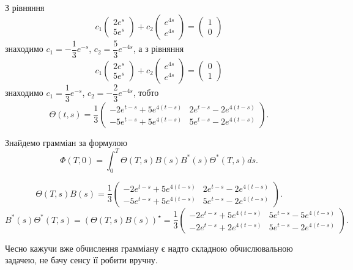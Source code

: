 \begin{solution}
    З рівняння
    \[ c_1 \begin{pmatrix} 2e^s \\ 5e^s \end{pmatrix} + c_2 \begin{pmatrix} e^{4s} \\ e^{4s} \end{pmatrix} = \begin{pmatrix} 1 \\ 0 \end{pmatrix} \]
    знаходимо $c_1 = -\dfrac13 e^{-s}$, $c_2 = \dfrac53 e^{-4s}$, а з рівняння
    \[ c_1 \begin{pmatrix} 2e^s \\ 5e^s \end{pmatrix} + c_2 \begin{pmatrix} e^{4s} \\ e^{4s} \end{pmatrix} = \begin{pmatrix} 0 \\ 1 \end{pmatrix} \]
    знаходимо $c_1 = \dfrac13 e^{-s}$, $c_2 = -\dfrac23 e^{-4s}$, тобто
    \[ \Theta(t, s) = \dfrac13\begin{pmatrix} -2 e^{t-s} + 5 e^{4(t-s)} & 2 e^{t-s} - 2 e^{4(t-s)} \\ -5 e^{t-s} + 5 e^{4(t-s)} & 5 e^{t-s} - 2 e^{4(t-s)} \end{pmatrix}. \]
    
    Знайдемо грамміан за формулою \[\Phi(T, 0) = \int_0^T \Theta(T, s) B(s) B^* (s) \Theta^*(T, s) ds. \]
    
    \[ \Theta(T, s) B(s) =  \dfrac13\begin{pmatrix} -2 e^{t-s} + 5 e^{4(t-s)} & 2 e^{t-s} - 2 e^{4(t-s)} \\ -5 e^{t-s} + 5 e^{4(t-s)} & 5 e^{t-s} - 2 e^{4(t-s)} \end{pmatrix}. \]
    \[ B^* (s) \Theta^*(T, s)  =  (\Theta(T, s) B(s))^\star =  \dfrac13\begin{pmatrix} -2 e^{t-s} + 5 e^{4(t-s)} & 5 e^{t-s} - 5 e^{4(t-s)} \\ -2 e^{t-s} + 2 e^{4(t-s)} & 5 e^{t-s} - 2 e^{4(t-s)} \end{pmatrix}. \]
    
    Чесно кажучи вже обчислення грамміану є надто складною обчислювальною задачею, не бачу сенсу її робити вручну.
\end{solution}

\begin{problem}
\end{problem}

